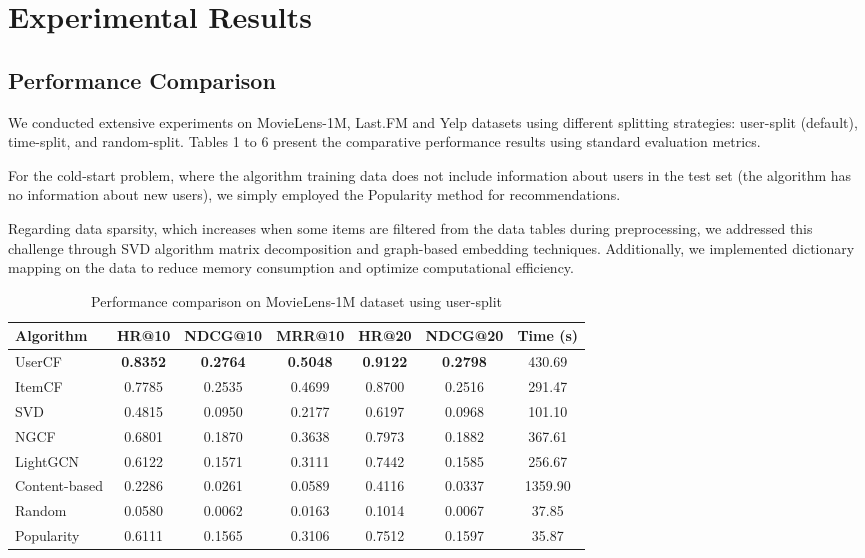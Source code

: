 \documentclass[sigconf,nonacm]{acmart} %
\begin{document}
\section{Experimental Results}  
\subsection{Performance Comparison}  

We conducted extensive experiments on MovieLens-1M, Last.FM and Yelp datasets using different splitting strategies: user-split (default), time-split, and random-split. Tables 1 to 6 present the comparative performance results using standard evaluation metrics.  


For the cold-start problem, where the algorithm training data does not include information about users in the test set (the algorithm has no information about new users), we simply employed the Popularity method for recommendations.  

Regarding data sparsity, which increases when some items are filtered from the data tables during preprocessing, we addressed this challenge through SVD algorithm matrix decomposition and graph-based embedding techniques. Additionally, we implemented dictionary mapping on the data to reduce memory consumption and optimize computational efficiency.  
\begin{table}[h]  
\caption{Performance comparison on MovieLens-1M dataset using user-split}  
\label{tab:ml1m}  
\centering  
\scriptsize  
\begin{tabular}{lcccccc}  
\hline  
\textbf{Algorithm} & \textbf{HR@10} & \textbf{NDCG@10} & \textbf{MRR@10} & \textbf{HR@20} & \textbf{NDCG@20} & \textbf{Time (s)} \\
\hline  
UserCF & \textbf{0.8352} & \textbf{0.2764} & \textbf{0.5048} & \textbf{0.9122} & \textbf{0.2798} & 430.69 \\
ItemCF & 0.7785 & 0.2535 & 0.4699 & 0.8700 & 0.2516 & 291.47 \\
SVD & 0.4815 & 0.0950 & 0.2177 & 0.6197 & 0.0968 & 101.10 \\
NGCF & 0.6801 & 0.1870 & 0.3638 & 0.7973 & 0.1882 & 367.61 \\
LightGCN & 0.6122 & 0.1571 & 0.3111 & 0.7442 & 0.1585 & 256.67 \\
Content-based & 0.2286 & 0.0261 & 0.0589 & 0.4116 & 0.0337 & 1359.90 \\
Random & 0.0580 & 0.0062 & 0.0163 & 0.1014 & 0.0067 & 37.85 \\
Popularity & 0.6111 & 0.1565 & 0.3106 & 0.7512 & 0.1597 & 35.87 \\
\hline  
\end{tabular}  
\end{table}  
\end{document}
